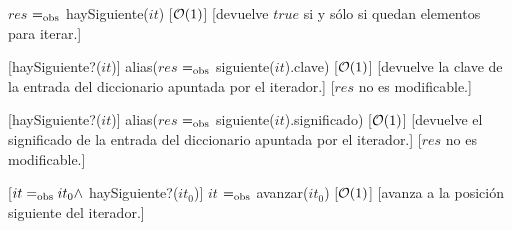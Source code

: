 \begin{Interfaz}
  {$res$ $=_{\mathrm{obs}}$ haySiguiente($it$)}
  [$\mathcal{O}(1)$]
  [devuelve $true$ si y sólo si quedan elementos para iterar.]  

  [haySiguiente?($it$)]  
  {alias($res$ $=_{\mathrm{obs}}$ siguiente($it$).clave)}
  [$\mathcal{O}(1)$]
  [devuelve la clave de la entrada del diccionario apuntada por el iterador.]  
  [$res$ no es modificable.]
  
  [haySiguiente?($it$)]  
  {alias($res$ $=_{\mathrm{obs}}$ siguiente($it$).significado)}
  [$\mathcal{O}(1)$]
  [devuelve el significado de la entrada del diccionario apuntada por el iterador.]  
  [$res$ no es modificable.]  
  
  [$it =_{\mathrm{obs}} it_0 \land$ haySiguiente?($it_0$)]  
  {$it$ $=_{\mathrm{obs}}$ avanzar($it_0$)}
  [$\mathcal{O}(1)$]
  [avanza a la posición siguiente del iterador.] 
  
\end{Interfaz}
